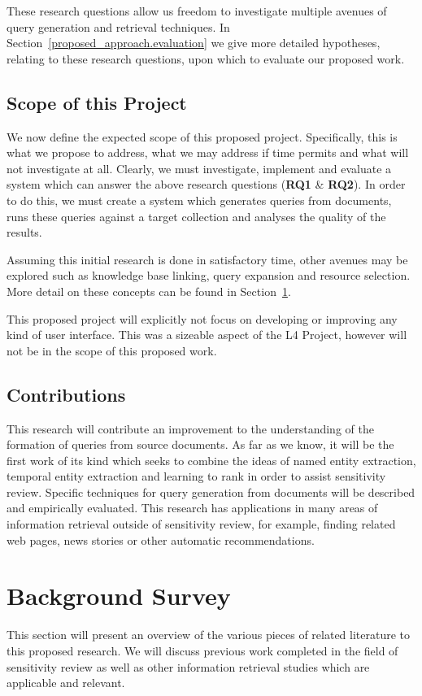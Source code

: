 \documentclass{mprop}
\begin{document}
These research questions allow us freedom to investigate multiple avenues of query generation and retrieval techniques. In Section~\ref{proposed_approach.evaluation} we give more detailed hypotheses, relating to these research questions, upon which to evaluate our proposed work.

\subsection{Scope of this Project}
We now define the expected scope of this proposed project. Specifically, this is what we propose to address, what we may address if time permits and what will not investigate at all.
Clearly, we must investigate, implement and evaluate a system which can answer the above research questions (\textbf{RQ1} \& \textbf{RQ2}). 
In order to do this, we must create a system which generates queries from documents, runs these queries against a target collection and analyses the quality of the results.

Assuming this initial research is done in satisfactory time, other avenues may be explored such as knowledge base linking, query expansion and resource selection. 
More detail on these concepts can be found in Section~\ref{background_survey}.

This proposed project will explicitly not focus on developing or improving any kind of user interface. 
This was a sizeable aspect of the L4 Project, however will not be in the scope of this proposed work.

\subsection{Contributions}
This research will contribute an improvement to the understanding of the formation of queries from source documents. As far as we know, it will be the first work of its kind which seeks to combine the ideas of named entity extraction, temporal entity extraction and learning to rank in order to assist sensitivity review.
Specific techniques for query generation from documents will be described and empirically evaluated. 
This research has applications in many areas of information retrieval outside of sensitivity review, for example, finding related web pages, news stories or other automatic recommendations.

\section{Background Survey} \label{background_survey}
This section will present an overview of the various pieces of related literature to this proposed research. 
We will discuss previous work completed in the field of sensitivity review as well as other information retrieval studies which are applicable and relevant.
\end{document}
